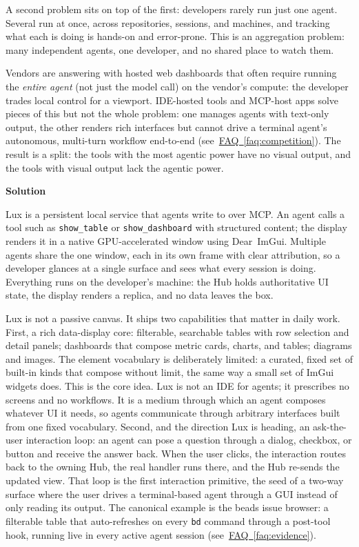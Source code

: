 \documentclass[11pt,letterpaper]{article}
\newcommand{\prsection}[1]{%
  \vspace{1em}%
  {\large\bfseries\color{SectionBlue}#1}%
  \vspace{0.3em}\par%
}
\newcommand{\faqref}[1]{\hyperref[#1]{FAQ~\ref*{#1}}}
\begin{document}
A second problem sits on top of the first: developers rarely run just one agent.
Several run at once, across repositories, sessions, and machines, and tracking
what each is doing is hands-on and error-prone. This is an aggregation problem:
many independent agents, one developer, and no shared place to watch them.

Vendors are answering with hosted web dashboards that often require running
the \emph{entire agent} (not just the model call) on the vendor's compute: the
developer trades local control for a viewport. IDE-hosted tools and MCP-host
apps solve pieces of this but not the whole problem: one manages agents with
text-only output, the other renders rich interfaces but cannot drive a
terminal agent's autonomous, multi-turn workflow end-to-end
(see~\faqref{faq:competition}). The result is a split: the tools with the most
agentic power have no visual output, and the tools with visual output lack the
agentic power.

\prsection{Solution}

Lux is a persistent local service that agents write to over MCP. An agent calls
a tool such as \texttt{show\_table} or \texttt{show\_dashboard} with structured
content; the display renders it in a native GPU-accelerated window using
Dear~ImGui. Multiple agents share the one window, each in its own frame with
clear attribution, so a developer glances at a single surface and sees what
every session is doing. Everything runs on the developer's machine: the Hub
holds authoritative UI state, the display renders a replica, and no data
leaves the box.

Lux is not a passive canvas. It ships two capabilities that matter in daily
work. First, a rich data-display core: filterable, searchable tables with row
selection and detail panels; dashboards that compose metric cards, charts, and
tables; diagrams and images. The element vocabulary is deliberately limited: a
curated, fixed set of built-in kinds that compose without limit, the same way
a small set of ImGui widgets does. This is the core idea. Lux is not an IDE for
agents; it prescribes no screens and no workflows. It is a medium through which
an agent composes whatever UI it needs, so agents communicate through arbitrary
interfaces built from one fixed vocabulary. Second, and the direction Lux is
heading, an
ask-the-user interaction loop: an agent can pose a question through a dialog,
checkbox, or button and receive the answer back. When the user clicks, the
interaction routes back to the owning Hub, the real handler runs there, and the
Hub re-sends the updated view. That loop is the first interaction primitive, the
seed of a two-way surface where the user drives a terminal-based agent through a
GUI instead of only reading its output. The canonical example is the beads issue
browser: a filterable table that auto-refreshes on every \texttt{bd} command
through a post-tool hook, running live in every active agent session
(see~\faqref{faq:evidence}).
\end{document}
